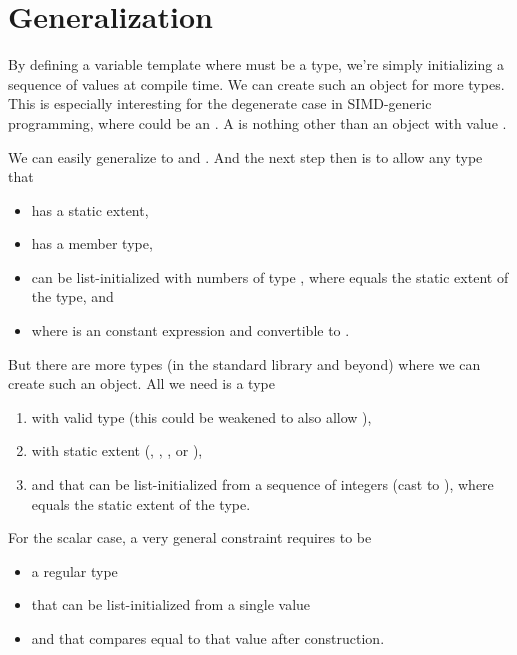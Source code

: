 \section{Generalization}
By defining a variable template \std{} where  must
be a \simd type, we're simply initializing a sequence of values at compile time.
We can create such an object for more types.
This is especially interesting for the degenerate case in SIMD-generic
programming, where  could \eg be an .
A \std{} is nothing other than an object  with value
.

We can easily generalize to \std{} and
\std{}.
And the next step then is to allow any type that
\begin{itemize}
  \item has a static extent,
  \item has a  member type,
  \item can be list-initialized with  numbers of type
    , where  equals the static extent of the type, and
  \item where  is an constant expression and convertible to .
\end{itemize}

But there are more types (in the standard library and beyond) where we can
create such an object.
All we need is a type
\begin{enumerate}
  \item with valid  type (this could be weakened
    to also allow ),
  \item with static extent (, ,
    , or ),
  \item and that can be list-initialized from a sequence of 
    integers (cast to ), where  equals
    the static extent of the type.
\end{enumerate}
For the scalar case, a very general constraint requires  to be
\begin{itemize}
  \item a regular type
  \item that can be list-initialized from a single value
  \item and that compares equal to that value after construction.
\end{itemize}

